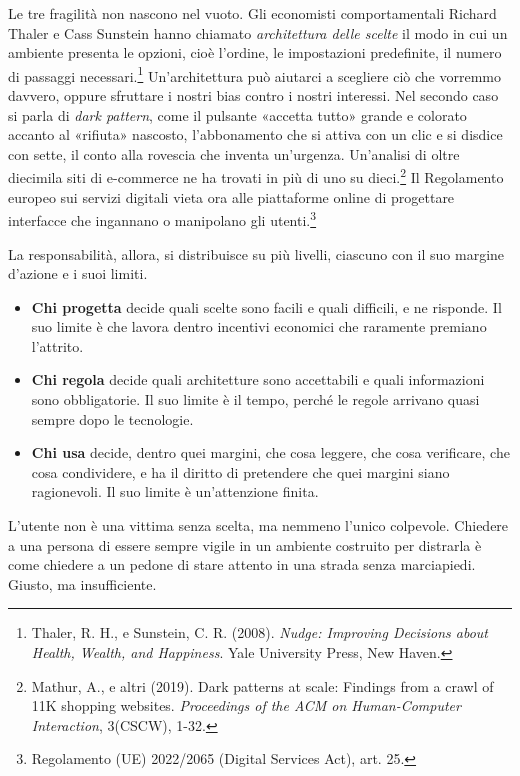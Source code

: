 Le tre fragilità non nascono nel vuoto. Gli economisti comportamentali Richard Thaler e Cass Sunstein hanno chiamato \textit{architettura delle scelte} il modo in cui un ambiente presenta le opzioni, cioè l'ordine, le impostazioni predefinite, il numero di passaggi necessari.\footnote{Thaler, R. H., e Sunstein, C. R. (2008). \textit{Nudge: Improving Decisions about Health, Wealth, and Happiness}. Yale University Press, New Haven.} Un'architettura può aiutarci a scegliere ciò che vorremmo davvero, oppure sfruttare i nostri bias contro i nostri interessi. Nel secondo caso si parla di \textit{dark pattern}, come il pulsante «accetta tutto» grande e colorato accanto al «rifiuta» nascosto, l'abbonamento che si attiva con un clic e si disdice con sette, il conto alla rovescia che inventa un'urgenza. Un'analisi di oltre diecimila siti di e-commerce ne ha trovati in più di uno su dieci.\footnote{Mathur, A., e altri (2019). Dark patterns at scale: Findings from a crawl of 11K shopping websites. \textit{Proceedings of the ACM on Human-Computer Interaction}, 3(CSCW), 1-32.} Il Regolamento europeo sui servizi digitali vieta ora alle piattaforme online di progettare interfacce che ingannano o manipolano gli utenti.\footnote{Regolamento (UE) 2022/2065 (Digital Services Act), art. 25.}

La responsabilità, allora, si distribuisce su più livelli, ciascuno con il suo margine d'azione e i suoi limiti.

\begin{itemize}
	\item \textbf{Chi progetta} decide quali scelte sono facili e quali difficili, e ne risponde. Il suo limite è che lavora dentro incentivi economici che raramente premiano l'attrito.
	\item \textbf{Chi regola} decide quali architetture sono accettabili e quali informazioni sono obbligatorie. Il suo limite è il tempo, perché le regole arrivano quasi sempre dopo le tecnologie.
	\item \textbf{Chi usa} decide, dentro quei margini, che cosa leggere, che cosa verificare, che cosa condividere, e ha il diritto di pretendere che quei margini siano ragionevoli. Il suo limite è un'attenzione finita.
\end{itemize}

L'utente non è una vittima senza scelta, ma nemmeno l'unico colpevole. Chiedere a una persona di essere sempre vigile in un ambiente costruito per distrarla è come chiedere a un pedone di stare attento in una strada senza marciapiedi. Giusto, ma insufficiente.

